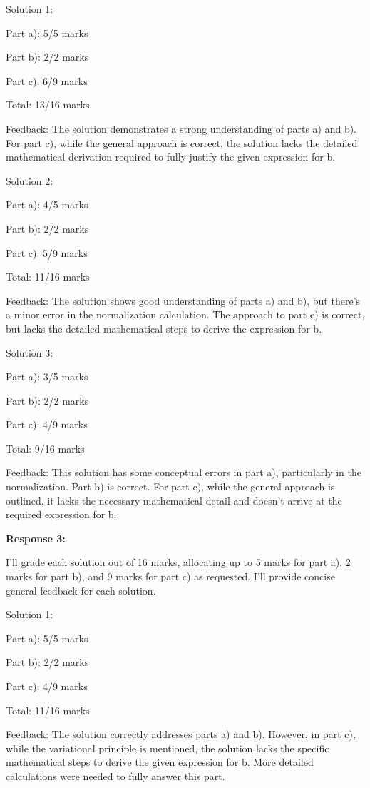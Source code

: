 \documentclass[a4paper,11pt]{article}
\begin{document}
Solution 1:

Part a): 5/5 marks

Part b): 2/2 marks

Part c): 6/9 marks

Total: 13/16 marks

Feedback: The solution demonstrates a strong understanding of parts a) and b). For part c), while the general approach is correct, the solution lacks the detailed mathematical derivation required to fully justify the given expression for b.

Solution 2:

Part a): 4/5 marks

Part b): 2/2 marks

Part c): 5/9 marks

Total: 11/16 marks

Feedback: The solution shows good understanding of parts a) and b), but there's a minor error in the normalization calculation. The approach to part c) is correct, but lacks the detailed mathematical steps to derive the expression for b.

Solution 3:

Part a): 3/5 marks

Part b): 2/2 marks

Part c): 4/9 marks

Total: 9/16 marks

Feedback: This solution has some conceptual errors in part a), particularly in the normalization. Part b) is correct. For part c), while the general approach is outlined, it lacks the necessary mathematical detail and doesn't arrive at the required expression for b.

\bigskip   
\textbf{Response 3:}

I'll grade each solution out of 16 marks, allocating up to 5 marks for part a), 2 marks for part b), and 9 marks for part c) as requested. I'll provide concise general feedback for each solution.

Solution 1:

Part a): 5/5 marks

Part b): 2/2 marks

Part c): 4/9 marks

Total: 11/16 marks

Feedback: The solution correctly addresses parts a) and b). However, in part c), while the variational principle is mentioned, the solution lacks the specific mathematical steps to derive the given expression for b. More detailed calculations were needed to fully answer this part.
\end{document}
